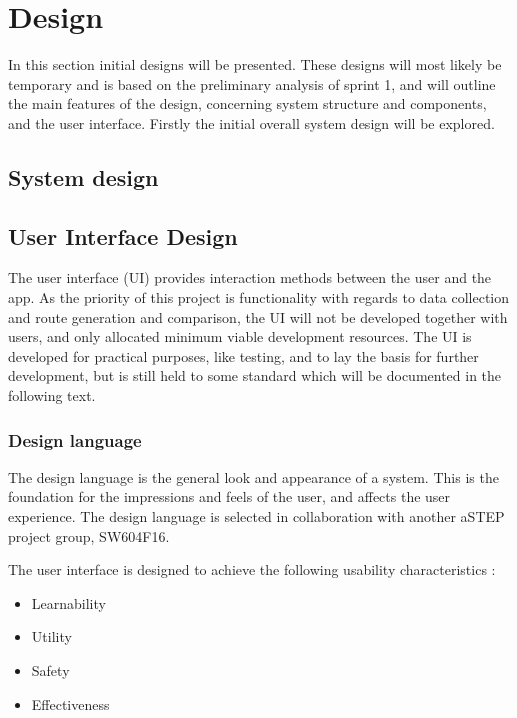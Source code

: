 \section{Design}\label{sprint1design}
In this section initial designs will be presented.
These designs will most likely be temporary and is based on the preliminary analysis of sprint 1, and will outline the main features of the design, concerning system structure and components, and the user interface.
Firstly the initial overall system design will be explored.

\subsection{System design}


\subsection{User Interface Design}
The user interface (UI) provides interaction methods between the user and the app.
As the priority of this project is functionality with regards to data collection and route generation and comparison, the UI will not be developed together with users, and only allocated minimum viable development resources. 
The UI is developed for practical purposes, like testing, and to lay the basis for further development, but is still held to some standard which will be documented in the following text. 

\subsubsection{Design language}
The design language is the general look and appearance of a system.
This is the foundation for the impressions and feels of the user, and affects the user experience.
The design language is selected in collaboration with another aSTEP project group, SW604F16.

The user interface is designed to achieve the following usability characteristics \cite{DIS2014}:
\begin{itemize}
	\item Learnability
	\item Utility
	\item Safety
	\item Effectiveness
\end{itemize}

